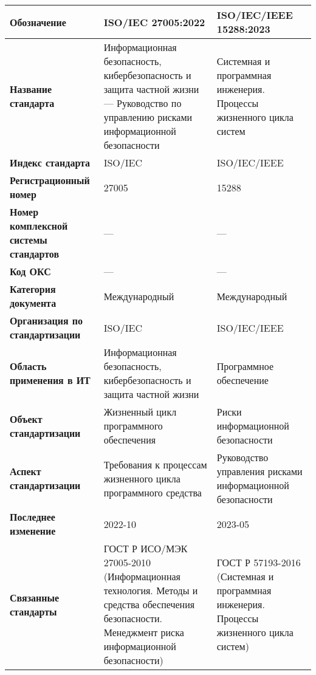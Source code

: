 \begin{table}[h!tp]
	\centering
	\caption{}
	\label{table:international}
	\begin{tabular}{|p{10em}|p{11em}|p{11em}|}
		\hline
		\textbf{Обозначение}
			& \textbf{ISO/IEC 27005:2022}
			& \textbf{ISO/IEC/IEEE 15288:2023} \\ \hline
		\textbf{Название стандарта}
			& Информационная безопасность, кибербезопасность
			и защита частной жизни ---
			Руководство по управлению рисками информационной безопасности
			& Системная и программная инженерия.
			Процессы жизненного цикла систем \\ \hline
		\textbf{Индекс стандарта}
			& ISO/IEC & ISO/IEC/IEEE \\ \hline
		\textbf{Регистрационный номер}
			& 27005 & 15288 \\ \hline
		\textbf{Номер комплексной системы стандартов}
			& --- & --- \\ \hline
		\textbf{Код ОКС}
			& --- & --- \\ \hline
		\textbf{Категория документа}
			& Международный & Международный \\ \hline
		\textbf{Организация по стандартизации}
			& ISO/IEC & ISO/IEC/IEEE \\ \hline
		\textbf{Область применения в ИТ}
			& Информационная безопасность, кибербезопасность
			и защита частной жизни
			& Программное обеспечение \\ \hline
		\textbf{Объект стандартизации}
			& Жизненный цикл программного обеспечения
			& Риски информационной безопасности \\ \hline
		\textbf{Аспект стандартизации}
			& Требования к процессам жизненного цикла программного средства
			& Руководство управления рисками информационной безопасности
			\\ \hline
		\textbf{Последнее изменение} & 2022-10 & 2023-05 \\ \hline
		\textbf{Связанные стандарты}
			& ГОСТ Р ИСО/МЭК 27005-2010 (Информационная технология.
			Методы и средства обеспечения безопасности.
			Менеджмент риска информационной безопасности)
			& ГОСТ Р 57193-2016 (Системная и программная инженерия.
			Процессы жизненного цикла систем) \\ \hline
	\end{tabular}
\end{table}

